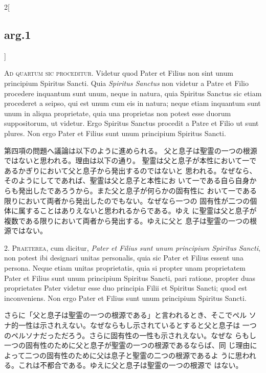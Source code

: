 \documentclass[paper=a4paper,fontsize=10pt,jafontsize=9pt,titlepage]{jlreq}
\begin{document}
\begin{paracol}{2}[\subsection{arg.1}]

{\scshape Ad quartum sic proceditur}. Videtur quod Pater et Filius non sint unum
principium  Spiritus Sancti. Quia {\itshape  Spiritus Sanctus} non
videtur a Patre et Filio procedere inquantum sunt unum, neque in
natura, quia Spiritus Sanctus sic etiam procederet a
seipso, qui est unum cum eis in natura; neque etiam inquantum sunt
unum in aliqua proprietate, quia una proprietas non potest esse duorum
suppositorum, ut videtur. Ergo Spiritus Sanctus procedit a
Patre et Filio ut sunt plures. Non ergo Pater et Filius sunt unum
principium  Spiritus Sancti.

\switchcolumn

第四項の問題へ議論は以下のように進められる。
父と息子は聖霊の一つの根源ではないと思われる。理由は以下の通り。
聖霊は父と息子が本性において一であるかぎりにおいて父と息子から発出するのではないと
 思われる。なぜなら、そのようにしてであれば、聖霊は父と息子と本性にお
 いて一である自ら自身からも発出したであろうから。また父と息子が何らかの固有性に
 おいて一である限りにおいて両者から発出したのでもない。なぜなら一つの
 固有性が二つの個体に属することはありえないと思われるからである。ゆえ
 に聖霊は父と息子が複数である限りにおいて両者から発出する。ゆえに父と
 息子は聖霊の一つの根源ではない。


2. {\scshape Praeterea}, cum dicitur, {\itshape Pater et Filius sunt unum principium  Spiritus
Sancti}, non potest ibi designari unitas personalis, quia sic Pater et
Filius essent una persona. Neque etiam unitas proprietatis, quia si
propter unam proprietatem Pater et Filius sunt unum principium
Spiritus Sancti, pari ratione, propter duas proprietates Pater videtur
esse duo principia Filii et  Spiritus Sancti; quod est
inconveniens. Non ergo Pater et Filius sunt unum principium  Spiritus
Sancti.

\switchcolumn

さらに「父と息子は聖霊の一つの根源である」と言われるとき、そこでペル
 ソナ的一性は示されえない。なぜならもし示されているとすると父と息子は
 一つのペルソナだっただろう。さらに固有性の一性も示されえない。なぜな
 らもし一つの固有性のために父と息子が聖霊の一つの根源であるならば、同
 じ理由によって二つの固有性のために父は息子と聖霊の二つの根源であるよ
 うに思われる。これは不都合である。ゆえに父と息子は聖霊の一つの根源で
 はない。


\end{paracol}
\end{document}
